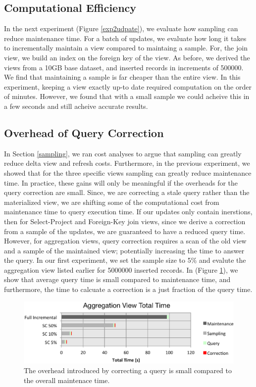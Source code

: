 \subsection{Computational Efficiency}
In the next experiment (Figure \ref{exp2udpate}), we evaluate how sampling can reduce maintenance time.
For a batch of updates, we evaluate how long it takes to incrementally maintain a view compared to maintaing a sample.
For, the join view, we build an index on the foreign key of the view.
As before, we derived the views from a 10GB base dataset, and inserted records in increments of 500000.
We find that maintaining a sample is far cheaper than the entire view. In this experiment, keeping a view exactly up-to date required computation on the order of minutes.
However, we found that with a small sample we could acheive this in a few seconds and still acheive accurate results.

\subsection{Overhead of Query Correction}
In Section \ref{sampling}, we ran cost analyses to argue that sampling can greatly reduce delta view and refresh costs.
Furthermore, in the previous experiment, we showed that for the three specific views sampling can greatly reduce maintenance time.
In practice, these gains will only be meaningful if the overheads for the query correction are small.
Since, we are correcting a stale query rather than the materialized view, we are shifting some of the computational cost from maintenance time to query execution time.
If our updates only contain inerstions, then for Select-Project and Foreign-Key join views, since we derive a correction from a sample of the updates, we are guaranteed to have a reduced query time.
However, for aggregation views, query correction requires a scan of the old view and a sample of the maintained view; potentially increasing the time to 
answer the query.
In our first experiment, we set the sample size to 5\% and evalute the aggregation view listed earlier for 5000000 inserted records. 
In (Figure \ref{exp10overheads}), we show that average query time is small compared to maintenance time, and furthermore, 
the time to calcuate a correction is a just fraction of the query time.
\begin{figure}[h]
\label{exp10overheads}
\centering
 \includegraphics[width=\columnwidth]{exp/total_time_agg_view.png}
 \caption{The overhead introduced by correcting a query is small compared to the overall maintenace time.}
\end{figure}

